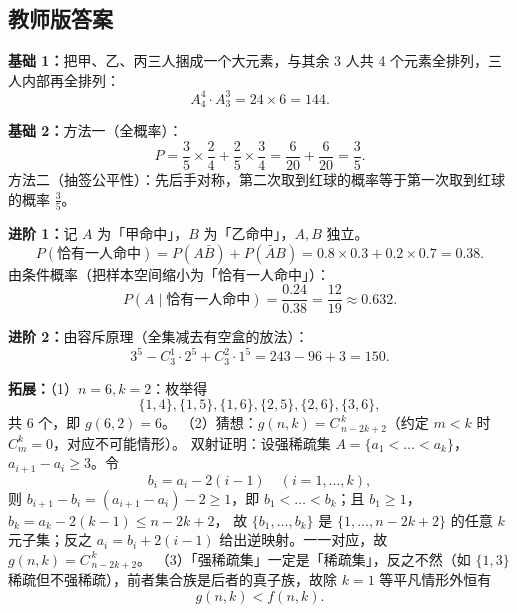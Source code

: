 \begin{afterclass}
\subsection*{教师版答案}
\begin{solution}
\textbf{基础 1：}把甲、乙、丙三人捆成一个大元素，与其余 3 人共 4 个元素全排列，三人内部再全排列：
\[
  A_4^4\cdot A_3^3=24\times6=144 .
\]
\end{solution}
\begin{solution}
\textbf{基础 2：}方法一（全概率）：
\[
  P=\frac35\times\frac24+\frac25\times\frac34=\frac{6}{20}+\frac{6}{20}=\frac{3}{5}.
\]
方法二（抽签公平性）：先后手对称，第二次取到红球的概率等于第一次取到红球的概率 $\frac35$。
\end{solution}
\begin{solution}
\textbf{进阶 1：}记 $A$ 为「甲命中」，$B$ 为「乙命中」，$A,B$ 独立。
\[
  P(\text{恰有一人命中})=P(A\bar B)+P(\bar A B)=0.8\times0.3+0.2\times0.7=0.38 .
\]
由条件概率（把样本空间缩小为「恰有一人命中」）：
\[
  P(A\mid \text{恰有一人命中})=\frac{0.24}{0.38}=\frac{12}{19}\approx0.632 .
\]
\end{solution}
\begin{solution}
\textbf{进阶 2：}由容斥原理（全集减去有空盒的放法）：
\[
  3^5-C_3^1\cdot2^5+C_3^2\cdot1^5=243-96+3=150 .
\]
\end{solution}
\begin{solution}
\textbf{拓展：}（1）$n=6,k=2$：枚举得
\[
  \{1,4\},\{1,5\},\{1,6\},\{2,5\},\{2,6\},\{3,6\},
\]
共 $6$ 个，即 $g(6,2)=6$。
（2）猜想：$g(n,k)=C_{\,n-2k+2}^{\,k}$（约定 $m<k$ 时 $C_m^k=0$，对应不可能情形）。
双射证明：设强稀疏集 $A=\{a_1<\dots<a_k\}$，$a_{i+1}-a_i\ge3$。令
\[
  b_i=a_i-2(i-1)\quad(i=1,\dots,k),
\]
则 $b_{i+1}-b_i=(a_{i+1}-a_i)-2\ge1$，即 $b_1<\dots<b_k$；且 $b_1\ge1$，$b_k=a_k-2(k-1)\le n-2k+2$，
故 $\{b_1,\dots,b_k\}$ 是 $\{1,\dots,n-2k+2\}$ 的任意 $k$ 元子集；反之 $a_i=b_i+2(i-1)$ 给出逆映射。一一对应，故 $g(n,k)=C_{\,n-2k+2}^{\,k}$。
（3）「强稀疏集」一定是「稀疏集」，反之不然（如 $\{1,3\}$ 稀疏但不强稀疏），前者集合族是后者的真子族，故除 $k=1$ 等平凡情形外恒有
\[
  g(n,k)<f(n,k).
\]
\end{solution}

\end{afterclass}
